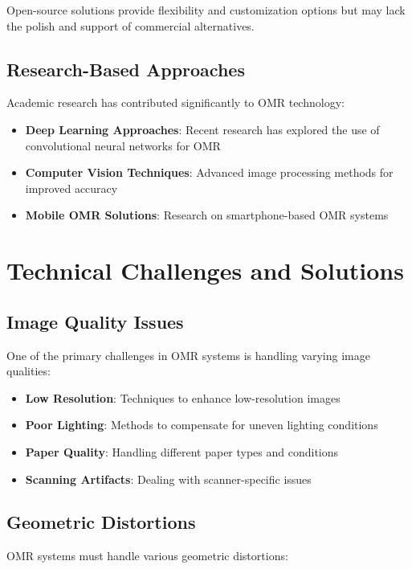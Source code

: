 Open-source solutions provide flexibility and customization options but may lack the polish and support of commercial alternatives.

\subsection{Research-Based Approaches}

Academic research has contributed significantly to OMR technology:

\begin{itemize}
\item \textbf{Deep Learning Approaches}: Recent research has explored the use of convolutional neural networks for OMR
\item \textbf{Computer Vision Techniques}: Advanced image processing methods for improved accuracy
\item \textbf{Mobile OMR Solutions}: Research on smartphone-based OMR systems
\end{itemize}

\section{Technical Challenges and Solutions}

\subsection{Image Quality Issues}

One of the primary challenges in OMR systems is handling varying image qualities:

\begin{itemize}
\item \textbf{Low Resolution}: Techniques to enhance low-resolution images
\item \textbf{Poor Lighting}: Methods to compensate for uneven lighting conditions
\item \textbf{Paper Quality}: Handling different paper types and conditions
\item \textbf{Scanning Artifacts}: Dealing with scanner-specific issues
\end{itemize}

\subsection{Geometric Distortions}

OMR systems must handle various geometric distortions:

